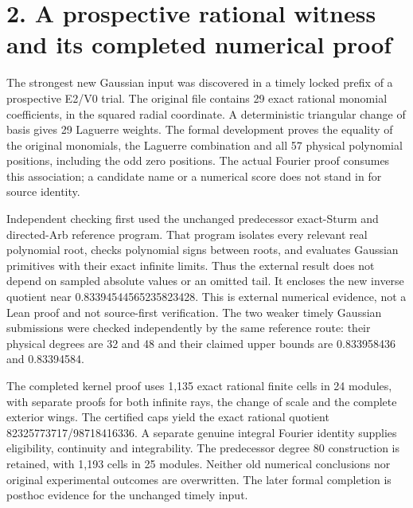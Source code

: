 \documentclass[11pt]{article}
\begin{document}
\begin{center}


\ifdim\wd\eqbox>\linewidth\resizebox{\linewidth}{!}{\usebox{\eqbox}}\else\usebox{\eqbox}\fi

\end{center}

\section{2. A prospective rational witness and its completed numerical proof}

The strongest new Gaussian input was discovered in a timely locked prefix of a prospective E2/V0 trial. The original file contains 29 exact rational monomial coefficients, in the squared radial coordinate. A deterministic triangular change of basis gives 29 Laguerre weights. The formal development proves the equality of the original monomials, the Laguerre combination and all 57 physical polynomial positions, including the odd zero positions. The actual Fourier proof consumes this association; a candidate name or a numerical score does not stand in for source identity.


Independent checking first used the unchanged predecessor exact-Sturm and directed-Arb reference program. That program isolates every relevant real polynomial root, checks polynomial signs between roots, and evaluates Gaussian primitives with their exact infinite limits. Thus the external result does not depend on sampled absolute values or an omitted tail. It encloses the new inverse quotient near 0.83394544565235823428. This is external numerical evidence, not a Lean proof and not source-first verification. The two weaker timely Gaussian submissions were checked independently by the same reference route: their physical degrees are 32 and 48 and their claimed upper bounds are 0.833958436 and 0.83394584.


The completed kernel proof uses 1,135 exact rational finite cells in 24 modules, with separate proofs for both infinite rays, the change of scale and the complete exterior wings. The certified caps yield the exact rational quotient 82325773717/98718416336. A separate genuine integral Fourier identity supplies eligibility, continuity and integrability. The predecessor degree 80 construction is retained, with 1,193 cells in 25 modules. Neither old numerical conclusions nor original experimental outcomes are overwritten. The later formal completion is posthoc evidence for the unchanged timely input.
\end{document}
